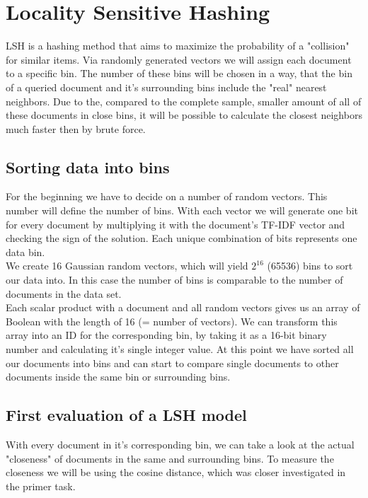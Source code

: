 \documentclass[12pt]{scrreprt}
\begin{document}
\chapter{Locality Sensitive Hashing}

LSH is a hashing method that aims to maximize the probability of a "collision" for similar items. Via randomly generated vectors we will assign each document to a specific bin. The number of these bins will be chosen in a way, that the bin of a queried document and it's surrounding bins include the "real" nearest neighbors. Due to the, compared to the complete sample, smaller amount of all of these documents in close bins, it will be possible to calculate the closest neighbors much faster then by brute force.\\


\section{Sorting data into bins}
For the beginning we have to decide on a number of random vectors. This number will define the number of bins. With each vector we will generate one bit for every document by multiplying it with the document's TF-IDF vector and checking the sign of the solution. Each unique combination of bits represents one data bin.\\

We create 16 Gaussian random vectors, which will yield $2^16$ (65536) bins to sort our data into. In this case the number of bins is comparable to the number of documents in the data set.\\

Each scalar product with a document and all random vectors gives us an array of Boolean with the length of 16 (= number of vectors). We can transform this array into an ID for the corresponding bin, by taking it as a 16-bit binary number and calculating it's single integer value. At this point we have sorted all our documents into bins and can start to compare single documents to other documents inside the same bin or surrounding bins.\\

\newpage
\section{First evaluation of a LSH model}
With every document in it's corresponding bin, we can take a look at the actual "closeness" of documents in the same and surrounding bins. To measure the closeness we will be using the cosine distance, which was closer investigated in the primer task.\\
\end{document}
